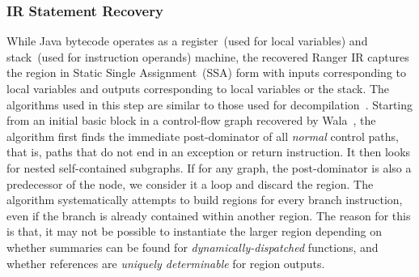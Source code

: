 \subsubsection{IR Statement Recovery}
%
%
While Java bytecode operates as a register~(used for local variables) and stack~(used for instruction operands)
machine, the recovered Ranger IR captures the region in Static Single Assignment~(SSA) form with inputs corresponding to
local variables and outputs corresponding to local variables or the stack.
%
The algorithms used in this step are similar to those used for decompilation~\cite{Yakdan15@decompilation}. %
%
Starting from an initial basic block in a control-flow graph recovered by Wala~\cite{Wala}, the algorithm first finds
the immediate post-dominator of all {\em normal} control paths, that is, paths that do not end in an exception or return
instruction.
%
It then looks for nested self-contained subgraphs.
%
If for any graph, the post-dominator is also a predecessor of the node, we consider it a loop and discard the region.
%
The algorithm systematically attempts to build regions for every branch instruction, even if the branch is already
contained within another region.
%
The reason for this is that, it may not be possible to instantiate the larger region depending on whether summaries can be found
for {\em dynamically-dispatched} functions, and whether references are {\em uniquely determinable} for region outputs.
